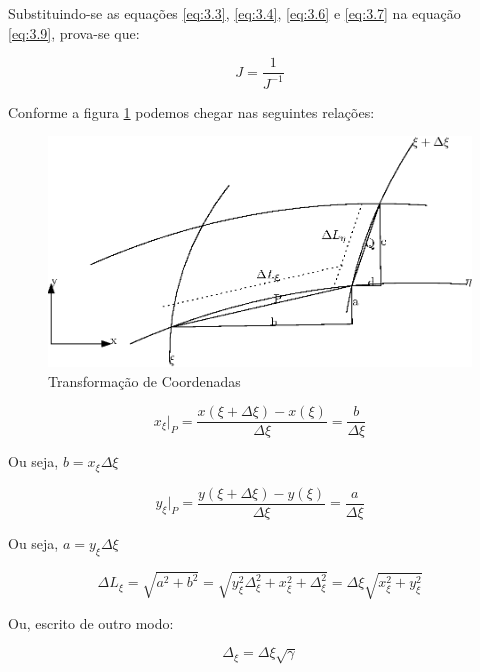 Substituindo-se as equações \ref{eq:3.3}, \ref{eq:3.4}, \ref{eq:3.6} e \ref{eq:3.7} na equação \ref{eq:3.9}, prova-se que:

\begin{equation}
    \label{eq:3.10}
    J = \frac{1}{J^{-1}}
\end{equation}

Conforme a figura \ref{figura9} podemos chegar nas seguintes relações:

\begin{figure}[]
    \centering
    \includegraphics{fig/transformacao.eps}
    \caption{Transformação de Coordenadas}
    \label{figura9}
\end{figure}

\begin{equation*}
    x_\xi \vert_P = \frac{x(\xi+\Delta \xi)-x(\xi)}{\Delta \xi} = \frac{b}{\Delta \xi}
\end{equation*}

Ou seja, $b=x_\xi \Delta \xi$

\begin{equation*}
    y_\xi \vert_P = \frac{y(\xi+\Delta \xi)-y(\xi)}{\Delta \xi} = \frac{a}{\Delta \xi}    
\end{equation*}

Ou seja, $a=y_\xi \Delta \xi$

\begin{equation*}
    \Delta L_\xi = \sqrt{a^2+b^2} = \sqrt{y_\xi^2 \Delta_\xi^2 + x_\xi^2+\Delta_\xi^2} = \Delta \xi \sqrt{x_\xi^2 + y_\xi^2}
\end{equation*}

Ou, escrito de outro modo:

\begin{equation}
    \label{eq:3.11}
    \Delta_\xi = \Delta \xi \sqrt{\gamma}
\end{equation}

